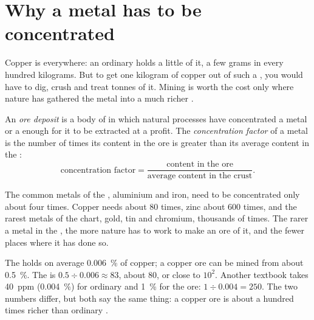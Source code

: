 \section{Why a metal has to be concentrated}

Copper is everywhere: an ordinary  holds a little of it, a few grams in
every hundred kilograms. But to get one kilogram of copper out of such a
, you would have to dig, crush and treat tonnes of it. Mining is worth
the cost only where nature has gathered the metal into a much richer .

\begin{definition}\label{def:g9:earth-resources:ore-deposit}
An \emph{ore deposit} is a body of  in which
natural processes have concentrated a metal or a  enough for it to
be extracted at a profit. The \emph{concentration
factor} of a metal is the number of times its
content in the ore is greater than its average content in the :
\[
\text{concentration factor} = \frac{\text{content in the ore}}{\text{average content in the crust}} .
\]
\end{definition}

The common metals of the , aluminium and iron, need to be concentrated
only about four times. Copper needs about 80 times, zinc about 600 times,
and the rarest metals of the chart, gold, tin and chromium, thousands of
times. The rarer a metal in the , the more nature has to work to make
an ore of it, and the fewer places where it has done so.

\begin{example}[Copper]
The  holds on average \qty{0.006}{\%} of copper; a copper ore can be
mined from about \qty{0.5}{\%}. The  is $0.5 \div 0.006
\approx 83$, about 80, or close to $10^2$. Another textbook takes \qty{40}{ppm}
(\qty{0.004}{\%}) for ordinary  and \qty{1}{\%} for the ore: $1 \div
0.004 = 250$. The two numbers differ, but both say the same thing: a
copper ore is about a hundred times richer than ordinary .
\end{example}

